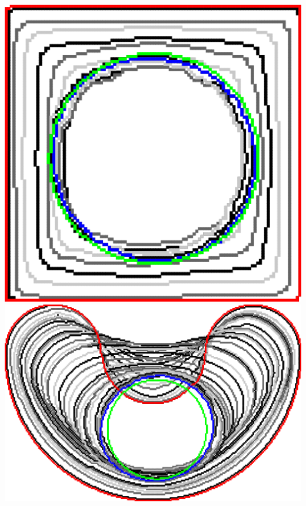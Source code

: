\begin{frame}
\begin{minipage}{0.49\textwidth}
\end{minipage}	
\begin{minipage}{0.49\textwidth}
\center
\includegraphics[scale=0.15]{figures/combinatorial-elastica/flow/ii/elastica/len_pen_0.01000/jonctions_1/curve_segs_4/best/gs_0.25000/square.png}\\[1em]
\includegraphics[scale=0.18]{figures/combinatorial-elastica/flow/ii/elastica/len_pen_0.01000/jonctions_1/curve_segs_4/best/gs_0.25000/bean.png}
\end{minipage}

\end{frame}

